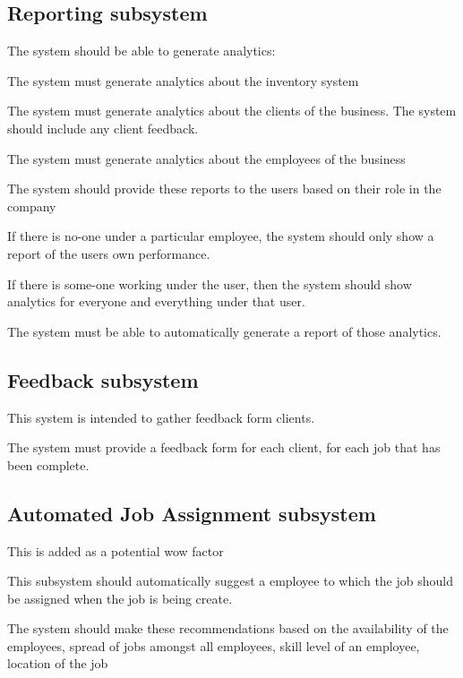 \documentclass{article}
\begin{document}
	
	\subsection*{Reporting subsystem}	
	\begin{list}{R.}{}
		\item The system should be able to generate analytics:
		\begin{list}{R.}{}
			\item The system must generate analytics about the inventory system
			\item The system must generate analytics about the clients of the business. The system should include any client feedback.
			\item The system must generate analytics about the employees of the business
			\begin{list}{R..}{}
				\item The system should provide these reports to the users based on their role in the company
				\item If there is no-one under a particular employee, the system should only show a report of the users own performance.
				\item If there is some-one working under the user, then the system should show analytics for everyone and everything under that user.
			\end{list}
		\end{list}
		\item The system must be able to automatically generate a report of those analytics. 
	\end{list}
	
	\subsection*{Feedback subsystem}	
		\begin{list}{R.}{}
			\item This system is intended to gather feedback form clients.
			\item The system must provide a feedback form for each client, for each job that has been complete.
		\end{list}
		
	\subsection*{Automated Job Assignment subsystem}
	This is added as a potential wow factor
	\begin{list}{R.}{}
		\item This subsystem should automatically suggest a employee to which the job should be assigned when the job is being create. 
		\item The system should make these recommendations based on the availability of the employees, spread of jobs amongst all employees, skill level of an employee, location of the job
	\end{list}
\end{document}
